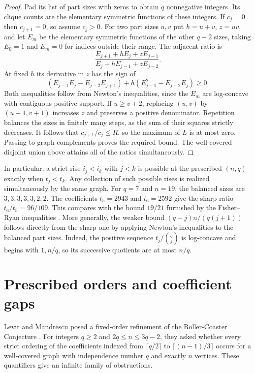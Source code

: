 \documentclass[11pt,a4paper]{article}
\begin{document}
\begin{proof}
Pad its list of part sizes with zeros to obtain $q$ nonnegative integers.
Its clique counts are the elementary symmetric functions of these
integers. If $c_j=0$ then $c_{j+1}=0$, so assume $c_j>0$.
For two part sizes $u,v$ put $h=u+v$, $z=uv$, and let $E_m$ be the
elementary symmetric functions of the other $q-2$ sizes, taking $E_0=1$
and $E_m=0$ for indices outside their range. The adjacent ratio is
\[
 \frac{E_{j+1}+hE_j+zE_{j-1}}{E_j+hE_{j-1}+zE_{j-2}}.
\]
At fixed $h$ its derivative in $z$ has the sign of
\[
 (E_{j-1}E_j-E_{j-2}E_{j+1})
   +h(E_{j-1}^2-E_{j-2}E_j)\ge0.
\]
Both inequalities follow from Newton's inequalities, since the
$E_m$ are log-concave with contiguous positive support. If $u\ge v+2$,
replacing $(u,v)$ by $(u-1,v+1)$ increases $z$ and preserves a positive
denominator. Repetition balances the sizes in finitely many steps,
as the sum of their squares strictly decreases. It follows that
$c_{j+1}/c_j\le R$, so the maximum of $L$ is at most zero. Passing
to graph complements proves the required bound. The well-covered
disjoint union above attains all of the ratios simultaneously.
\end{proof}

In particular, a strict rise $i_j<i_k$ with $j<k$ is possible at the
prescribed $(n,q)$ exactly when $t_j<t_k$. Any collection of such
possible rises is realized simultaneously by the same graph. For
$q=7$ and $n=19$, the balanced sizes are $3,3,3,3,3,2,2$. The
coefficients $t_5=2943$ and $t_6=2592$ give the sharp ratio
$t_6/t_5=96/109$. This compares with the bound $19/21$ furnished by
the Fisher--Ryan inequalities \cite{fisherryan}. More generally, the
weaker bound $(q-j)n/(q(j+1))$ follows directly from the sharp one
by applying Newton's inequalities to the balanced part sizes. Indeed,
the positive sequence $t_j/\binom qj$ is log-concave and begins with
$1,n/q$, so its successive quotients are at most $n/q$.

\section{Prescribed orders and coefficient gaps}
\label{sec:prescribed-order}

Levit and Mandrescu posed a fixed-order refinement of the Roller-Coaster
Conjecture \cite[Conjecture~1.5]{levitroller}. For integers $q\ge2$ and
$2q\le n\le3q-2$, they asked whether every strict ordering of the
coefficients indexed from $\lceil q/2\rceil$ to $\lceil(n-1)/3\rceil$
occurs for a well-covered graph with independence number $q$ and exactly
$n$ vertices. These quantifiers give an infinite family of obstructions.
\end{document}
